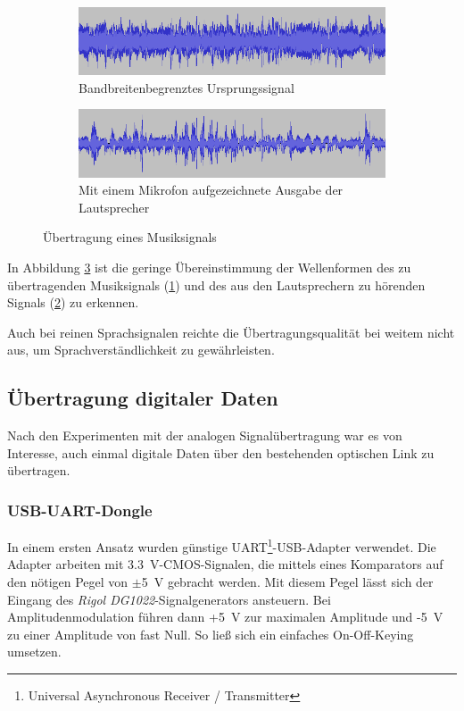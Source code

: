 \documentclass[12pt,a4paper]{article}
\begin{document}
\begin{figure}[H]
  \centering
  \begin{subfigure}[b]{1.0\textwidth}
    \includegraphics[width=\textwidth]{../audacity_sent.png}
    \caption{Bandbreitenbegrenztes Ursprungssignal}
    \label{fig:audacity_sent}
  \end{subfigure}  
  \begin{subfigure}[b]{1.0\textwidth}
    \includegraphics[width=\textwidth]{../audacity_received.png}
    \caption{Mit einem Mikrofon aufgezeichnete Ausgabe der Lautsprecher}
    \label{fig:audacity_received}
  \end{subfigure}  
  \caption{Übertragung eines Musiksignals}
  \label{fig:audacity}
\end{figure}

In Abbildung \ref{fig:audacity} ist die geringe Übereinstimmung der Wellenformen des zu übertragenden Musiksignals (\ref{fig:audacity_sent}) und des aus den Lautsprechern zu hörenden Signals (\ref{fig:audacity_received}) zu erkennen.

Auch bei reinen Sprachsignalen reichte die Übertragungsqualität bei weitem nicht aus, um Sprachverständlichkeit zu gewährleisten.

\subsection{Übertragung digitaler Daten}
Nach den Experimenten mit der analogen Signalübertragung war es von Interesse, auch einmal digitale Daten über den bestehenden optischen Link zu übertragen.

\subsubsection{USB-UART-Dongle}
In einem ersten Ansatz wurden günstige UART\footnote{Universal Asynchronous Receiver / Transmitter}-USB-Adapter verwendet. Die Adapter arbeiten mit \SI{3.3}{\volt}-CMOS-Signalen, die mittels eines Komparators auf den nötigen Pegel von $\pm$\SI{5}{\volt} gebracht werden. Mit diesem Pegel lässt sich der Eingang des \textit{Rigol DG1022}-Signalgenerators ansteuern. Bei Amplitudenmodulation führen dann +\SI{5}{\volt} zur maximalen Amplitude und -\SI{5}{\volt} zu einer Amplitude von fast Null. So ließ sich ein einfaches On-Off-Keying umsetzen.
\end{document}
